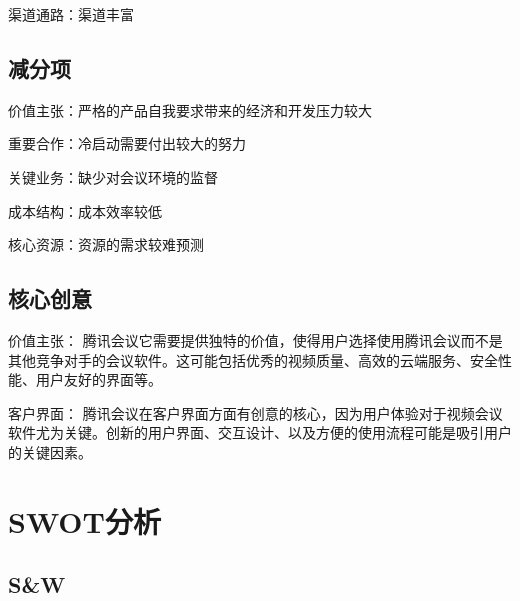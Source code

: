 \documentclass[a4paper,12pt]{article}
\begin{document}
    渠道通路：渠道丰富
    
    \subsection{减分项}
    价值主张：严格的产品⾃我要求带来的经济和开发压⼒较⼤
    
    重要合作：冷启动需要付出较⼤的努⼒
    
    关键业务：缺少对会议环境的监督
    
    成本结构：成本效率较低
    
    核⼼资源：资源的需求较难预测

    \subsection{核心创意}

    价值主张： 腾讯会议它需要提供独特的价值，使得用户选择使用腾讯会议而不是其他竞争对手的会议软件。这可能包括优秀的视频质量、高效的云端服务、安全性能、用户友好的界面等。
    
    客户界面： 腾讯会议在客户界面方面有创意的核心，因为用户体验对于视频会议软件尤为关键。创新的用户界面、交互设计、以及方便的使用流程可能是吸引用户的关键因素。
    

    \section{SWOT分析}
    \subsection{S\&W}
\end{document}
